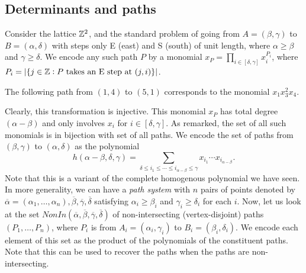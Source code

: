 \subsection{Determinants and paths}

	Consider the lattice $\mathbb{Z}^2$, and the standard problem of going from $A = (\beta,\gamma)$ to $B = (\alpha,\delta)$ with steps only E (east) and S (south) of unit length, where $\alpha \ge \beta$ and $\gamma \ge \delta$. We encode any such path $P$ by a monomial $x_P = \prod_{i \in [\delta,\gamma]} x_i^{P_i}$, where $P_i = |\{ j \in \mathbb{Z} : \text{$P$ takes an E step at $(j,i)$} \}|$.\\

	\begin{fex}
		The following path from $(1,4)$ to $(5,1)$ corresponds to the monomial $x_1x_3^2x_4$.
		\begin{center}
		\end{center}
	\end{fex}


	Clearly, this transformation is injective. This monomial $x_P$ has total degree $(\alpha - \beta)$ and only involves $x_i$ for $i \in [\delta,\gamma]$. As remarked, the set of all such monomials is in bijection with set of all paths. We encode the set of paths from $(\beta,\gamma)$ to $(\alpha,\delta)$ as the polynomial
	\[ h(\alpha-\beta,\delta,\gamma) = \sum_{\delta \le i_1 \le \cdots \le i_{\alpha-\beta} \le \gamma} x_{i_1} \cdots x_{i_{\alpha-\beta}}. \]
	Note that this is a variant of the complete homogenous polynomial we have seen.\\
	In more generality, we can have a \emph{path system} with $n$ pairs of points denoted by $\overline{\alpha} = (\alpha_1,\ldots,\alpha_n), \overline{\beta}, \overline{\gamma}, \overline{\delta}$ satisfying $\alpha_i \ge \beta_i$ and $\gamma_i \ge \delta_i$ for each $i$. Now, let us look at the set $NonIn(\overline{\alpha},\overline{\beta},\overline{\gamma},\overline{\delta})$ of non-intersecting (vertex-disjoint) paths $(P_1,\ldots,P_n)$, where $P_i$ is from $A_i = (\alpha_i,\gamma_i)$ to $B_i = (\beta_i,\delta_i)$. We encode each element of this set as the product of the polynomials of the constituent paths. Note that this can be used to recover the paths when the paths are non-intersecting.
	
